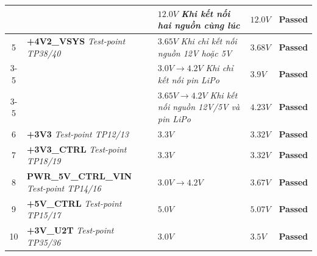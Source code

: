 \begin{longtable}{|c|p{}|p{}|p{}|c|}
                &  &  $12.0 V$ \newline \textit{Khi kết nối hai nguồn cùng lúc} & $12.0 V$ & \textcolor{modern_blue}{\textbf{Passed}} \\ \hline
                
                5 & \textbf{+4V2\_VSYS} \newline \textit{Test-point TP38/40} & $3.65 V$ \newline \textit{Khi chỉ kết nối nguồn 12V hoặc 5V} & $3.68 V$ & \textcolor{modern_blue}{\textbf{Passed}} \\ \cline{3-5}
                
                &  &  $3.0 V \rightarrow 4.2 V$ \newline \textit{Khi chỉ kết nối pin LiPo} & $3.9 V$ & \textcolor{modern_blue}{\textbf{Passed}} \\ \cline{3-5}
                
                &  &  $3.65 V \rightarrow 4.2 V$ \newline \textit{Khi kết nối nguồn 12V/5V và pin LiPo} & $4.23 V$ & \textcolor{modern_blue}{\textbf{Passed}} \\ \hline
                
                6 & \textbf{+3V3} \newline \textit{Test-point TP12/13} & $3.3 V$ & $3.32 V$ & \textcolor{modern_blue}{\textbf{Passed}} \\ \hline
                
                7 & \textbf{+3V3\_CTRL} \newline \textit{Test-point TP18/19} & $3.3 V$ & $3.32 V$ & \textcolor{modern_blue}{\textbf{Passed}} \\ \hline
                
                8 & \textbf{PWR\_5V\_CTRL\_VIN} \newline \textit{Test-point TP14/16} & $3.0 V \rightarrow 4.2 V$ & $3.67 V$ & \textcolor{modern_blue}{\textbf{Passed}} \\ \hline
                
                9 & \textbf{+5V\_CTRL} \newline \textit{Test-point TP15/17} & $5.0 V$ & $5.07 V$ & \textcolor{modern_blue}{\textbf{Passed}} \\ \hline
                
                10 & \textbf{+3V\_U2T} \newline \textit{Test-point TP35/36} & $3.0 V$ & $3.5 V$ & \textcolor{modern_blue}{\textbf{Passed}} \\ \hline
                

\end{longtable}
